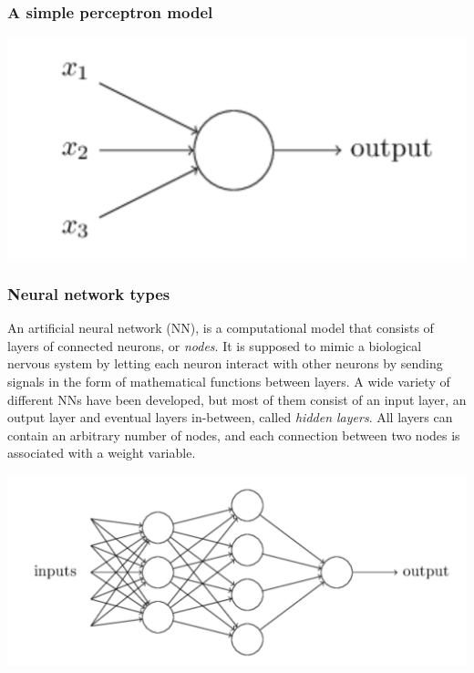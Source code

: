 \documentclass{beamer}
\begin{document}
\begin{frame}
\frametitle{A simple perceptron model}

\vspace{6mm}

\centerline{\includegraphics[width=0.9\linewidth]{figures/perceptron.png}}

\vspace{6mm}
\end{frame}

\begin{frame}
\frametitle{Neural network types}

\begin{block}{}
An artificial neural network (NN), is a computational model that consists of layers of connected neurons, or \emph{nodes}. 
It is supposed to mimic a biological nervous system by letting each neuron interact with other neurons
by sending signals in the form of mathematical functions between layers. 
A wide variety of different NNs have
been developed, but most of them consist of an input layer, an output layer and eventual layers in-between, called
\emph{hidden layers}. All layers can contain an arbitrary number of nodes, and each connection between two nodes
is associated with a weight variable. 



\vspace{6mm}

\centerline{\includegraphics[width=0.6\linewidth]{figures/dnn.png}}

\vspace{6mm}


\end{block}
\end{frame}
\end{document}
